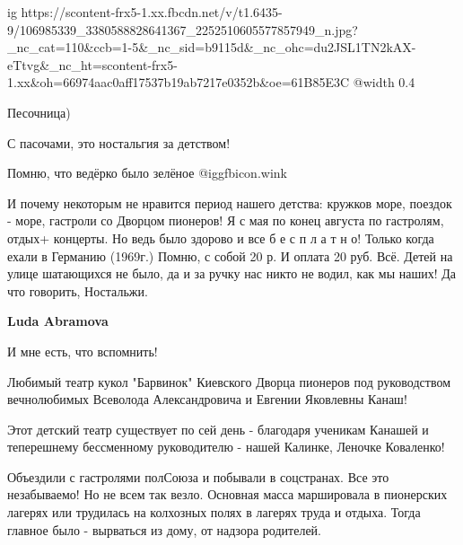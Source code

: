  
 
 
 
 

\ifcmt
  ig https://scontent-frx5-1.xx.fbcdn.net/v/t1.6435-9/106985339_3380588828641367_2252510605577857949_n.jpg?_nc_cat=110&ccb=1-5&_nc_sid=b9115d&_nc_ohc=du2JSL1TN2kAX-eTtvg&_nc_ht=scontent-frx5-1.xx&oh=66974aac0aff17537b19ab7217e0352b&oe=61B85E3C
  @width 0.4
\fi

Песочница)

С пасочами, это ностальгия за детством!

Помню, что ведёрко было зелёное  @igg{fbicon.wink} 


И почему некоторым не нравится период нашего детства: кружков море, поездок -
море, гастроли со Дворцом пионеров! Я с мая по конец августа по гастролям,
отдых+ концерты. Но ведь было здорово и все б е с п л а т н о! Только когда
ехали в Германию (1969г.) Помню, с собой 20 р. И оплата 20 руб. Всё. Детей на
улице шатающихся не было, да и за ручку нас никто не водил, как мы наших! Да
что говорить, Ностальжи.

\textbf{Luda Abramova} 

И мне есть, что вспомнить!

Любимый театр кукол "Барвинок" Киевского Дворца пионеров под руководством
вечнолюбимых Всеволода Александровича и Евгении Яковлевны Канаш!

Этот детский театр существует по сей день - благодаря ученикам Канашей и
теперешнему бессменному руководителю - нашей Калинке, Леночке Коваленко!

Объездили с гастролями полСоюза и побывали в соцстранах.  Все это незабываемо!
Но не всем так везло.  Основная масса маршировала в пионерских лагерях или
трудилась на колхозных полях в лагерях труда и отдыха.  Тогда главное было -
вырваться из дому, от надзора родителей.
